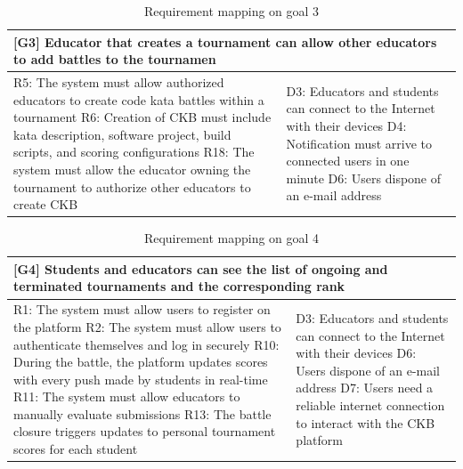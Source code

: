 \begin{table}[H]
    \centering
    \begin{tabular}{|p{8cm}|p{8cm}|}
    \hline
        \multicolumn{2}{|p{16cm}|}{\textbf{[G3] Educator that creates a tournament can allow other educators to add battles to the tournamen}} \\
    \hline
        R5: The system must allow authorized educators to create code kata battles within a tournament \newline
        R6: Creation of CKB must include kata description, software project, build scripts, and scoring configurations \newline
        R18: The system must allow the educator owning the tournament to authorize other educators to create CKB  
         &
         D3: Educators and students can connect to the Internet with their devices \newline
         D4: Notification must arrive to connected users in one minute \newline
         D6: Users dispone of an e-mail address \\
    \hline
    \end{tabular}
    \caption{Requirement mapping on goal 3}
    \label{tab:g3}
\end{table}
\begin{table}[h!]
    \centering
    \begin{tabular}{|p{8cm}|p{8cm}|}
    \hline
        \multicolumn{2}{|p{16cm}|}{\textbf{[G4] Students and educators can see the list of ongoing and terminated tournaments and the corresponding rank}} \\
    \hline
        R1: The system must allow users to register on the platform \newline
        R2: The system must allow users to authenticate themselves and log in securely \newline
        R10: During the battle, the platform updates scores with every push made by students in real-time \newline
        R11: The system must allow educators to manually evaluate submissions \newline
        R13: The battle closure triggers updates to personal tournament scores for each student
        &
        D3: Educators and students can connect to the Internet with their devices \newline
        D6: Users dispone of an e-mail address \newline
        D7: Users need a reliable internet connection to interact with the CKB platform \newline
        \\
    \hline
    \end{tabular}
    \caption{Requirement mapping on goal 4}
    \label{tab:g4}
\end{table}
